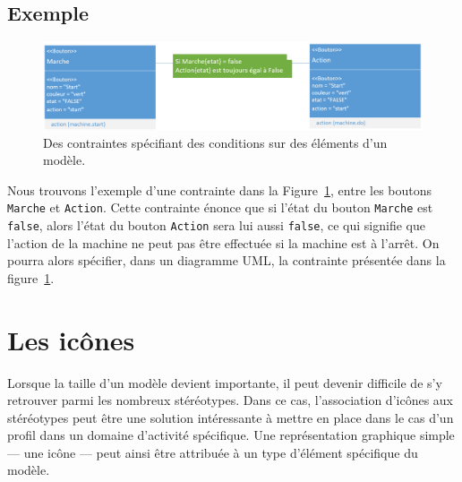 \subsection*{Exemple}
%
\begin{figure}[H]
    \begin{center}
    \includegraphics[width=\linewidth]{10_img/chap4/constraint.PNG}
    \caption[Des contraintes sp\'ecifiant des conditions sur un modèle.]{Des contraintes sp\'ecifiant des conditions sur des \'el\'ements d'un modèle.}
    \label{fig.uml_con}
    \end{center}
\end{figure}


Nous trouvons l'exemple d'une contrainte dans la Figure~\ref{fig.uml_con}, entre les boutons \texttt{Marche} et \texttt{Action}.
Cette contrainte énonce que si l'état du bouton \texttt{Marche} est \texttt{false}, alors l'état du bouton \texttt{Action} sera lui aussi \texttt{false},
ce qui signifie que l'action de la machine ne peut pas être effectuée si la machine est à l'arrêt.
On pourra alors sp\'ecifier, dans un diagramme UML, la contrainte présent\'ee dans la figure~\ref{fig.uml_con}.


\section{Les ic\^ones}
Lorsque la taille d'un modèle devient importante, il peut devenir difficile de s'y retrouver parmi les nombreux st\'er\'eotypes.
Dans ce cas, l'association d'ic\^ones aux st\'er\'eotypes peut être une solution int\'eressante à mettre en place dans le cas d'un profil dans un domaine d'activité spécifique.
Une représentation graphique simple --- une ic\^one --- peut ainsi être attribuée à un type d'élément spécifique du modèle.

